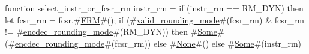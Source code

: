 function select_instr_or_fcsr_rm instr_rm =
  if (instr_rm == RM_DYN)
  then {
    let fcsr_rm = fcsr.#\hyperref[sailRISCVzFRM]{FRM}#();
    if (#\hyperref[sailRISCVzvalidzyroundingzymode]{valid\_rounding\_mode}#(fcsr_rm) & fcsr_rm != #\hyperref[sailRISCVzencdeczyroundingzymode]{encdec\_rounding\_mode}#(RM_DYN))
      then #\hyperref[sailRISCVzSome]{Some}#(#\hyperref[sailRISCVzencdeczyroundingzymode]{encdec\_rounding\_mode}#(fcsr_rm)) else #\hyperref[sailRISCVzNone]{None}#()
  }
  else #\hyperref[sailRISCVzSome]{Some}#(instr_rm)
